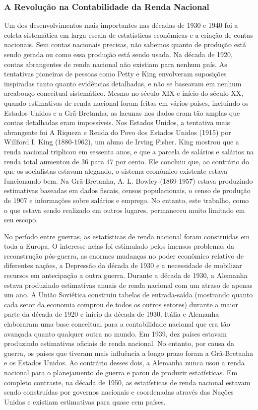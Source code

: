 \documentclass[12pt]{article}
\begin{document}
\subsubsection{\textbf{A Revolução na Contabilidade da Renda Nacional}}

Um dos desenvolvimentos mais importantes nas décadas de 1930 e 1940 foi a coleta sistemática em larga escala de estatísticas econômicas e a criação de contas nacionais. Sem contas nacionais precisas, não sabemos quanto de produção está sendo gerada ou como essa produção está sendo usada. Na década de 1920, contas abrangentes de renda nacional não existiam para nenhum país. As tentativas pioneiras de pessoas como Petty e King envolveram suposições inspiradas tanto quanto evidências detalhadas, e não se baseavam em nenhum arcabouço conceitual sistemático. Mesmo no século XIX e início do século XX, quando estimativas de renda nacional foram feitas em vários países, incluindo os Estados Unidos e a Grã-Bretanha, as lacunas nos dados eram tão amplas que contas detalhadas eram impossíveis. Nos Estados Unidos, a tentativa mais abrangente foi A Riqueza e Renda do Povo dos Estados Unidos (1915) por Willford I. King (1880-1962), um aluno de Irving Fisher. King mostrou que a renda nacional triplicou em sessenta anos, e que a parcela de salários e salários na renda total aumentou de 36 para 47 por cento. Ele concluiu que, ao contrário do que os socialistas estavam alegando, o sistema econômico existente estava funcionando bem. Na Grã-Bretanha, A. L. Bowley (1869-1957) estava produzindo estimativas baseadas em dados fiscais, censos populacionais, o censo de produção de 1907 e informações sobre salários e emprego. No entanto, este trabalho, como o que estava sendo realizado em outros lugares, permaneceu muito limitado em seu escopo.

No período entre guerras, as estatísticas de renda nacional foram construídas em toda a Europa. O interesse nelas foi estimulado pelos imensos problemas da reconstrução pós-guerra, as enormes mudanças no poder econômico relativo de diferentes nações, a Depressão da década de 1930 e a necessidade de mobilizar recursos em antecipação a outra guerra. Durante a década de 1930, a Alemanha estava produzindo estimativas anuais de renda nacional com um atraso de apenas um ano. A União Soviética construiu tabelas de entrada-saída (mostrando quanto cada setor da economia comprou de todos os outros setores) durante a maior parte da década de 1920 e início da década de 1930. Itália e Alemanha elaboraram uma base conceitual para a contabilidade nacional que era tão avançada quanto qualquer outra no mundo. Em 1939, dez países estavam produzindo estimativas oficiais de renda nacional. No entanto, por causa da guerra, os países que tiveram mais influência a longo prazo foram a Grã-Bretanha e os Estados Unidos. Ao contrário desses dois, a Alemanha nunca usou a renda nacional para o planejamento de guerra e parou de produzir estatísticas. Em completo contraste, na década de 1950, as estatísticas de renda nacional estavam sendo construídas por governos nacionais e coordenadas através das Nações Unidas e existiam estimativas para quase cem países.
\end{document}
